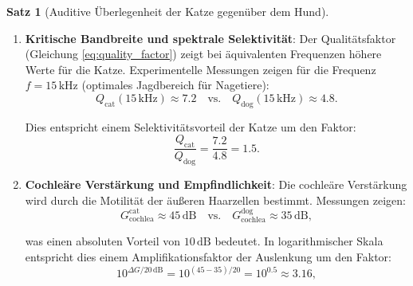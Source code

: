 ﻿\documentclass[12pt, a4paper]{article}
\theoremstyle{definition}
\newtheorem{satz}{Satz}[section]
\theoremstyle{remark}
\begin{document}
\begin{satz}[Auditive Überlegenheit der Katze gegenüber dem Hund]
\begin{enumerate}
\begin{equation}
\alpha_{\mathrm{dog}} = \frac{1}{L_{\text{cochlea}}^{\mathrm{dog}}}\ln\left(\frac{f_{\max}^{\mathrm{dog}}}{f_{\min}}\right) \approx \frac{1}{28}\ln\left(\frac{45 \times 10^3}{100}\right) \approx 0.141\,\mathrm{mm}^{-1}.
\label{eq:alpha_dog}
\end{equation}

Das Verhältnis zeigt:
\begin{equation}
\frac{\alpha_{\mathrm{cat}}}{\alpha_{\mathrm{dog}}} = \frac{0.159}{0.141} \approx 1.128,
\label{eq:alpha_ratio_cat_dog}
\end{equation}

was eine um etwa $12.8\%$ höhere Frequenzauflösungs-Dichte bei der Katze bedeutet.

\item \textbf{Kritische Bandbreite und spektrale Selektivität}: 
Der Qualitätsfaktor (Gleichung \ref{eq:quality_factor}) zeigt bei äquivalenten Frequenzen höhere Werte für die Katze. Experimentelle Messungen zeigen für die Frequenz $f = 15\,\mathrm{kHz}$ (optimales Jagdbereich für Nagetiere):
\begin{equation}
Q_{\mathrm{cat}}(15\,\mathrm{kHz}) \approx 7.2 \quad \text{vs.} \quad Q_{\mathrm{dog}}(15\,\mathrm{kHz}) \approx 4.8.
\label{eq:q_15khz_comparison}
\end{equation}

Dies entspricht einem Selektivitätsvorteil der Katze um den Faktor:
\begin{equation}
\frac{Q_{\mathrm{cat}}}{Q_{\mathrm{dog}}} = \frac{7.2}{4.8} = 1.5.
\label{eq:q_ratio_cat_dog}
\end{equation}

\item \textbf{Cochleäre Verstärkung und Empfindlichkeit}: 
Die cochleäre Verstärkung wird durch die Motilität der äußeren Haarzellen bestimmt. Messungen zeigen:
\begin{equation}
G_{\text{cochlea}}^{\mathrm{cat}} \approx 45\,\mathrm{dB} \quad \text{vs.} \quad G_{\text{cochlea}}^{\mathrm{dog}} \approx 35\,\mathrm{dB},
\label{eq:cochlear_gain_cat_dog}
\end{equation}

was einen absoluten Vorteil von $10\,\mathrm{dB}$ bedeutet. In logarithmischer Skala entspricht dies einem Amplifikationsfaktor der Auslenkung um den Faktor:
\begin{equation}
10^{\Delta G / 20\,\mathrm{dB}} = 10^{(45-35)/20} = 10^{0.5} \approx 3.16,
\label{eq:amplification_factor_cat_dog}
\end{equation}


\end{enumerate}
\end{satz}
\end{document}
